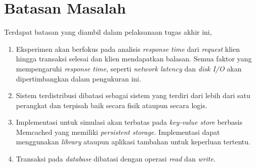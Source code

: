 \section{Batasan Masalah}

Terdapat batasan yang diambil dalam pelaksanaan tugas akhir ini,

\begin{enumerate}
    \item Eksperimen akan berfokus pada analisis \textit{response time} dari \textit{request} klien hingga transaksi selesai dan klien mendapatkan balasan. Semua faktor yang mempengaruhi \textit{response time}, seperti \textit{network latency} dan \textit{disk I/O} akan dipertimbangkan dalam pengukuran ini.
    \item Sistem terdistribusi dibatasi sebagai sistem yang terdiri dari lebih dari satu perangkat dan terpisah baik secara fisik ataupun secara logis.
    \item Implementasi untuk simulasi akan terbatas pada \textit{key-value store} berbasis Memcached yang memiliki \textit{persistent storage}. Implementasi dapat menggunakan \textit{library} ataupun aplikasi tambahan untuk keperluan tertentu.
    \item Transaksi pada \textit{database} dibatasi dengan operasi \textit{read} dan \textit{write}.
\end{enumerate}
